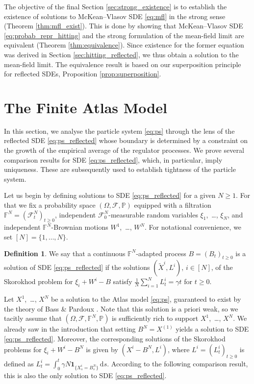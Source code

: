 \documentclass[11pt, a4paper]{article}
\theoremstyle{plain}
\theoremstyle{definition}
\newtheorem{definition}[theorem]{Definition}
\theoremstyle{remark}
\numberwithin{equation}{section}
\newcommand{\pr}{\mathbb{P}}
\newcommand{\F}{\mathcal{F}}
\renewcommand{\d}{\mathrm{d}}
\newcommand{\define}{\mathpunct{:}}
\newcommand{\bb}[1]{\mathbb{#1}}
\renewcommand{\bf}[1]{\mathbf{#1}}
\begin{document}
The objective of the final Section \ref{sec:strong_existence} is to establish the existence of solutions to McKean--Vlasov SDE \eqref{eq:mfl} in the strong sense (Theorem \ref{thm:mfl_exist}). This is done by showing that McKean--Vlasov SDE \eqref{eq:probab_repr_hitting} and the strong formulation of the mean-field limit are equivalent (Theorem \ref{thm:equivalence}). Since existence for the former equation was derived in Section \ref{sec:hitting_reflected}, we thus obtain a solution to the mean-field limit. The equivalence result is based on our superposition principle for reflected SDEs, Proposition \ref{prop:superposition}.

\section{The Finite Atlas Model} \label{sec:finite}

In this section, we analyse the particle system \eqref{eq:ps} through the lens of the reflected SDE \eqref{eq:ps_reflected} whose boundary is determined by a constraint on the growth of the empirical average of the regulator processes. We prove several comparison results for SDE \eqref{eq:ps_reflected}, which, in particular, imply uniqueness. These are subsequently used to establish tightness of the particle system. 

Let us begin by defining solutions to SDE \eqref{eq:ps_reflected} for a given $N \geq 1$. For that we fix a probability space $(\Omega, \F, \pr)$ equipped with a filtration $\bb{F}^N = (\F^N_t)_{t \geq 0}$, independent $\F^N_0$-measurable random variables $\xi_1$,~\ldots, $\xi_N$, and independent $\bb{F}^N$-Brownian motions $W^1$,~\ldots, $W^N$. %
For notational convenience, we set $[N] = \{1, \dots, N\}$.

\begin{definition} \label{def:ps_reflected}
We say that a continuous $\bb{F}^N$-adapted process $B = (B_t)_{t \geq 0}$ is a solution of SDE \eqref{eq:ps_reflected} if the solutions $(\tilde{X}^i, L^i)$, $i \in [N]$, of the Skorokhod problem for $\xi_i + W^i - B$ satisfy $\frac{1}{N} \sum_{i = 1}^N L^i_t = \gamma t$ for $t \geq 0$.
\end{definition}

Let $X^1$,~\ldots, $X^N$ be a solution to the Atlas model \eqref{eq:ps}, guaranteed to exist by the theory of Bass \& Pardoux \cite{bass_uniqueness_piecewise_1987}. Note that this solution is a priori weak, so we tacitly assume that $(\Omega, \F, \bb{F}^N, \pr)$ is sufficiently rich to support $X^1$,~\ldots, $X^N$. We already saw in the introduction that setting $B^N = X^{(1)}$ yields a solution to SDE \eqref{eq:ps_reflected}. Moreover, the corresponding solutions of the Skorokhod problems for $\xi_i + W^i - B^N$ is given by $(X^i - B^N, L^i)$, where $L^i = (L^i_t)_{t \geq 0}$ is defined as $L^i_t = \int_0^t \gamma N \bf{1}_{\{X^i_s = B^N_s\}} \, \d s$. According to the following comparison result, this is also the only solution to SDE \eqref{eq:ps_reflected}.
\end{document}
